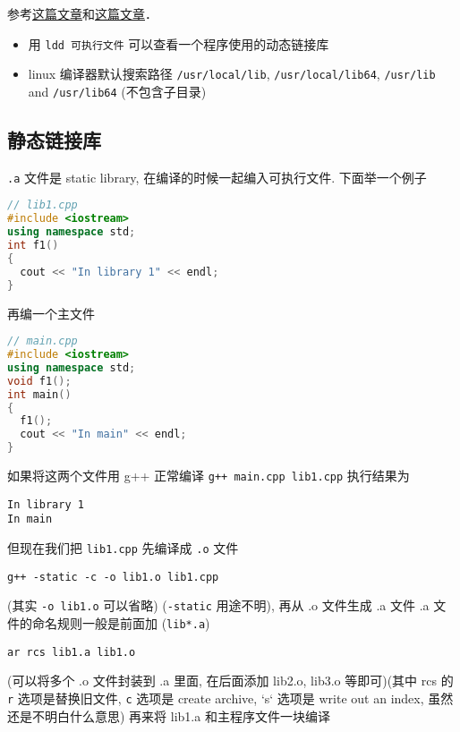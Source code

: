 
参考\href{https://blog.feabhas.com/2014/04/static-and-dynamic-libraries-on-linux/}{这篇文章}和\href{https://gcc.gnu.org/onlinedocs/gcc/Link-Options.html}{这篇文章}．

\begin{itemize}
\item 用 \verb`ldd 可执行文件` 可以查看一个程序使用的动态链接库
\item linux 编译器默认搜索路径 \verb`/usr/local/lib`, \verb`/usr/local/lib64`, \verb`/usr/lib` and \verb`/usr/lib64` (不包含子目录)
\end{itemize}

\subsection{静态链接库}

\verb|.a| 文件是 static library, 在编译的时候一起编入可执行文件. 下面举一个例子

\begin{lstlisting}[language=cpp]
// lib1.cpp
#include <iostream>
using namespace std;
int f1()
{
  cout << "In library 1" << endl;
}
\end{lstlisting}

再编一个主文件

\begin{lstlisting}[language=cpp]
// main.cpp
#include <iostream>
using namespace std;
void f1();
int main()
{
  f1();
  cout << "In main" << endl;
}
\end{lstlisting}

如果将这两个文件用 g++ 正常编译 \verb`g++ main.cpp lib1.cpp` 执行结果为
\begin{lstlisting}
In library 1
In main
\end{lstlisting}
但现在我们把 \verb|lib1.cpp| 先编译成 \verb|.o| 文件

\begin{lstlisting}
g++ -static -c -o lib1.o lib1.cpp
\end{lstlisting}

(其实 \verb`-o lib1.o` 可以省略) (\verb`-static` 用途不明), 再从 .o 文件生成 .a 文件 .a 文件的命名规则一般是前面加 (\verb`lib*.a`)

\begin{lstlisting}
ar rcs lib1.a lib1.o
\end{lstlisting}

(可以将多个 .o 文件封装到 .a 里面, 在后面添加 lib2.o, lib3.o 等即可)(其中 rcs 的 \verb`r` 选项是替换旧文件, \verb`c` 选项是 create archive, `s` 选项是 write out an index, 虽然还是不明白什么意思) 再来将 lib1.a 和主程序文件一块编译

